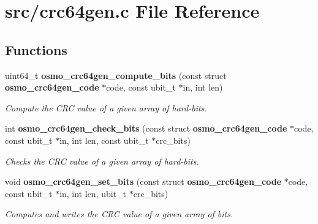 \section{src/crc64gen.c File Reference}
\label{crc64gen_8c}
\subsection*{Functions}
\begin{DoxyCompactItemize}
\item 
uint64\+\_\+t \textbf{ osmo\+\_\+crc64gen\+\_\+compute\+\_\+bits} (const struct \textbf{ osmo\+\_\+crc64gen\+\_\+code} $\ast$code, const ubit\+\_\+t $\ast$in, int len)
\begin{DoxyCompactList}\small\item\em Compute the C\+RC value of a given array of hard-\/bits. \end{DoxyCompactList}\item 
int \textbf{ osmo\+\_\+crc64gen\+\_\+check\+\_\+bits} (const struct \textbf{ osmo\+\_\+crc64gen\+\_\+code} $\ast$code, const ubit\+\_\+t $\ast$in, int len, const ubit\+\_\+t $\ast$crc\+\_\+bits)
\begin{DoxyCompactList}\small\item\em Checks the C\+RC value of a given array of hard-\/bits. \end{DoxyCompactList}\item 
void \textbf{ osmo\+\_\+crc64gen\+\_\+set\+\_\+bits} (const struct \textbf{ osmo\+\_\+crc64gen\+\_\+code} $\ast$code, const ubit\+\_\+t $\ast$in, int len, ubit\+\_\+t $\ast$crc\+\_\+bits)
\begin{DoxyCompactList}\small\item\em Computes and writes the C\+RC value of a given array of bits. \end{DoxyCompactList}\end{DoxyCompactItemize}
